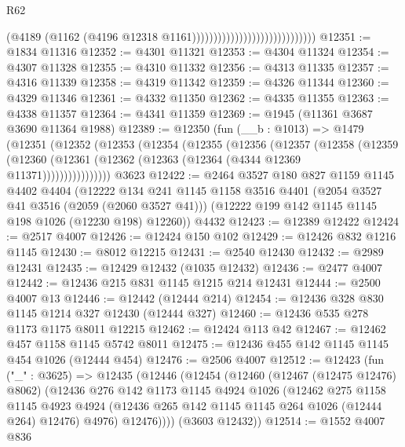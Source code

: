 \begin{lexlean}{R62}
\begin{coremodule}
                                                        (@4189
                                                          (@1162
                                                            (@4196
                                                              @12318
                                                              @1161)))))))))))))))))))))))))))))
@12351 := @1834 @11316
@12352 := @4301 @11321
@12353 := @4304 @11324
@12354 := @4307 @11328
@12355 := @4310 @11332
@12356 := @4313 @11335
@12357 := @4316 @11339
@12358 := @4319 @11342
@12359 := @4326 @11344
@12360 := @4329 @11346
@12361 := @4332 @11350
@12362 := @4335 @11355
@12363 := @4338 @11357
@12364 := @4341 @11359
@12369 := @1945 (@11361 @3687 @3690 @11364 @1988)
@12389 := @12350
    (fun (__b : @1013) =>
    @1479
      (@12351
        (@12352
          (@12353
            (@12354
              (@12355
                (@12356
                  (@12357
                    (@12358
                      (@12359
                        (@12360 (@12361 (@12362 (@12363 (@12364 (@4344 @12369 @11371))))))))))))))))
    @3623
@12422 := @2464
    @3527
    @180
    @827
    @1159
    @1145
    @4402
    @4404
    (@12222
      @134
      @241
      @1145
      @1158
      @3516
      @4401
      (@2054 @3527 @41 @3516 (@2059 (@2060 @3527 @41)))
      (@12222 @199 @142 @1145 @1145 @198 @1026 (@12230 @198) @12260))
    @4432
@12423 := @12389 @12422
@12424 := @2517 @4007
@12426 := @12424 @150 @102
@12429 := @12426 @832 @1216 @1145
@12430 := @8012 @12215
@12431 := @2540 @12430
@12432 := @2989 @12431
@12435 := @12429 @12432 (@1035 @12432)
@12436 := @2477 @4007
@12442 := @12436 @215 @831 @1145 @1215 @214 @12431
@12444 := @2500 @4007 @13
@12446 := @12442 (@12444 @214)
@12454 := @12436 @328 @830 @1145 @1214 @327 @12430 (@12444 @327)
@12460 := @12436 @535 @278 @1173 @1175 @8011 @12215
@12462 := @12424 @113 @42
@12467 := @12462 @457 @1158 @1145 @5742 @8011
@12475 := @12436 @455 @142 @1145 @1145 @454 @1026 (@12444 @454)
@12476 := @2506 @4007
@12512 := @12423
    (fun ("_" : @3625) =>
    @12435
      (@12446
        (@12454
          (@12460
            (@12467 (@12475 @12476) @8062)
            (@12436
              @276
              @142
              @1173
              @1145
              @4924
              @1026
              (@12462
                @275
                @1158
                @1145
                @4923
                @4924
                (@12436 @265 @142 @1145 @1145 @264 @1026 (@12444 @264) @12476)
                @4976)
              @12476))))
      (@3603 @12432))
@12514 := @1552 @4007 @836

\end{coremodule}
\end{lexlean}
